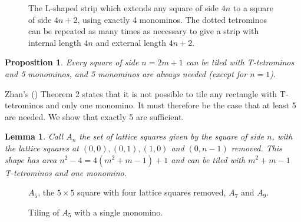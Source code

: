 \documentclass{article}
\theoremstyle{plain}
\newtheorem{proposition}[theorem]{Proposition}
\newtheorem{lemma}[theorem]{Lemma}
\begin{document}
\begin{figure}\label{lshaped}

\caption{The L-shaped strip which extends any square of side $4n$ to a square of side $4n+2$, using exactly 4 monominos. The dotted tetrominos can be repeated as many times as necessary to give a strip with internal length $4n$ and external length $4n + 2$.}
\end{figure}

\begin{proposition}\label{odd}
Every square of side $n = 2m + 1$ can be tiled with T-tetrominos and 5 monominos, and 5 monominos are always needed (except for $n = 1$).
\end{proposition}
Zhan's (\cite{zhan}) Theorem 2 states that it is not possible to tile any rectangle with T-tetrominos and only one monomino. It must therefore be the case that at least 5 are needed. We show that exactly 5 are sufficient.

\begin{lemma}
Call $A_n$ the set of lattice squares given by the square of side $n$, with the lattice squares at $(0, 0), (0,1), (1, 0)$ and $(0, n-1)$ removed. This shape has area $n^2 - 4 = 4(m^2 + m - 1) + 1$ and can be tiled with $m^2 + m - 1$ T-tetrominos and one monomino.
\end{lemma}

\begin{figure}\label{cropped}

\caption{$A_5$, the $5 \times 5$ square with four lattice squares removed, $A_7$ and $A_9$.}
\end{figure}

\begin{figure}\label{five}

\caption{Tiling of $A_5$ with a single monomino.}
\end{figure}

{}

\end{document}
